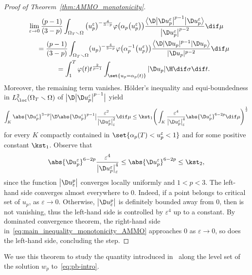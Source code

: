 \begin{proof}[Proof of Theorem~\ref{thm:AMMO_monotonicity}]
\begin{gather*}
 \lim_{\varepsilon \to 0}\frac{(p-1)}{(3-p)} \int_{\Omega_T \smallsetminus \Omega} \big(u^\varepsilon_p\big)^{-\frac{4}{3-p}}\varphi \big(\alpha_p\big(u^\varepsilon_p\big)\big) \frac{\big\langle\D \big| \D u^\varepsilon_p\big|^{p-1}\big|\D u^\varepsilon_p\big\rangle}{\big| \D u_p^\varepsilon\big|^{p-2} }\dif \mu\\
\qquad {} =\frac{(p-1)}{(3-p)} \int_{\Omega_T \smallsetminus \Omega} (u_p)^{-\frac{4}{3-p}}\varphi \big(\alpha_p^{-1}\big(u^\varepsilon_p\big)\big)\frac{\big\langle\D | \D u_p |^{p-1}|\D u_p\big\rangle}{| \D u_p |^{p-2} }\dif \mu\\
\qquad {} =\int_1^T\varphi(t)t^{\frac{2}{p-1}}\int_{\set{u_p=\alpha_p(t)}} |\D u_p | \H \dif \sigma \dif t.
\end{gather*}
Moreover, the remaining term vanishes. H\"older's inequality and equi-boundedness in $L_{\loc}^2(\Omega_T \smallsetminus \Omega)$ of $\big|\D \big|\D u^\varepsilon_p\big|^{p-1}\big|$ yield
\begin{equation}\label{eq:main_inequality_monotonicity_AMMO}
 \int_{K}\abs{\D u^\varepsilon_p}^{3-p}\big|\D \abs{ \D u^\varepsilon_p}^{p-1}\big|\frac{ \varepsilon^2}{\big| \D u^\varepsilon_p\big|_\varepsilon^2}\dif \mu\leq \kst_1\Bigg(\int_K\frac{\varepsilon^4}{\big| \D u^\varepsilon_p\big|_\varepsilon^4} \abs{\D u^\varepsilon_p}^{6-2p}\dif \mu\Bigg)^\frac{1}{2}
\end{equation}
for every $K$ compactly contained in $\set{ \alpha_p(T) < u_p^\varepsilon <1}$ and for some positive constant $\kst_1$. Observe that
\[
 \abs{\D u^\varepsilon_p}^{6-2p}\frac{\varepsilon^4}{\big| \D u^\varepsilon_p\big|_\varepsilon^4} \leq \abs{\D u^\varepsilon_p}^{6-2p}\leq \kst_2,
\]
since the function $\big| \D u_\varepsilon^p\big|$ converges locally uniformly and $1<p<3$. The left-hand side converges almost everywhere to $0$. Indeed, if a point belongs to critical set of $u_p$,  as $\varepsilon\to 0$. Otherwise, $\big| \D u_\varepsilon^p\big|$ is definitely bounded away from $0$, then  is not vanishing, thus the left-hand side is controlled by $\varepsilon^4$ up to a constant. By dominated convergence theorem, the right-hand side in~\eqref{eq:main_inequality_monotonicity_AMMO} approaches $0$ as $\varepsilon \to 0$, so does the left-hand side, concluding the step. \end{proof}

We use this theorem to study the quantity introduced in~\cite[Theorem 1.2]{chan_monotonicitygreenfunctions_2022} along the level set of the solution $w_p$ to~\eqref{eq:pb-intro}.

